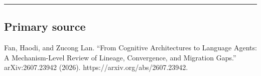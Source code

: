 \begin{center}\rule{0.5\linewidth}{0.5pt}\end{center}

\subsection{Primary source}\label{primary-source}

Fan, Haodi, and Zucong Lan. ``From Cognitive Architectures to Language Agents: A Mechanism-Level Review of Lineage, Convergence, and Migration Gaps.'' arXiv:2607.23942 (2026). https://arxiv.org/abs/2607.23942.\autocite{fanlan2026mechanisms}
